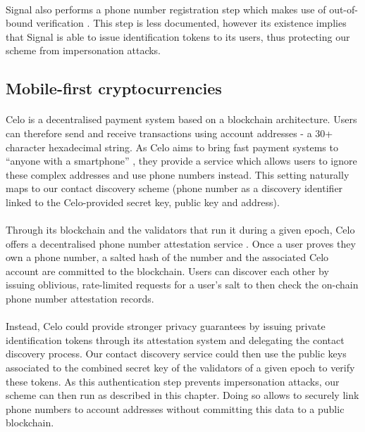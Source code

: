 	\paragraph{} Signal also performs a phone number registration step which makes use of out-of-bound verification \cite{Signal:Reg}. This step is less documented, however its existence implies that Signal is able to issue identification tokens to its users, thus protecting our scheme from impersonation attacks. 
	
	\subsection{Mobile-first cryptocurrencies}
	
	\paragraph{} Celo is a decentralised payment system based on a blockchain architecture. Users can therefore send and receive transactions using account addresses - a 30+ character hexadecimal string. As Celo aims to bring fast payment systems to ``anyone with a smartphone'' \cite{Celo:Doc}, they provide a service which allows users to ignore these complex addresses and use phone numbers instead. This setting naturally maps to our contact discovery scheme (phone number as a discovery identifier linked to the Celo-provided secret key, public key and address).
	
	\paragraph{} Through its blockchain and the validators that run it during a given epoch, Celo offers a decentralised phone number attestation service \cite{Celo:Phone}. Once a user proves they own a phone number, a salted hash of the number and the associated Celo account are committed to the blockchain. Users can discover each other by issuing oblivious, rate-limited requests for a user's salt to then check the on-chain phone number attestation records.	
	
	\paragraph{} Instead, Celo could provide stronger privacy guarantees by issuing private identification tokens through its attestation system and delegating the contact discovery process. Our contact discovery service could then use the public keys associated to the combined secret key of the validators of a given epoch to verify these tokens. As this authentication step prevents impersonation attacks, our scheme can then run as described in this chapter. Doing so allows to securely link phone numbers to account addresses without committing this data to a public blockchain.
	
	
	
	
	
	
	
	
	
	
	
	
	
	
	
	
	
	
	
	
	
	
	
	
